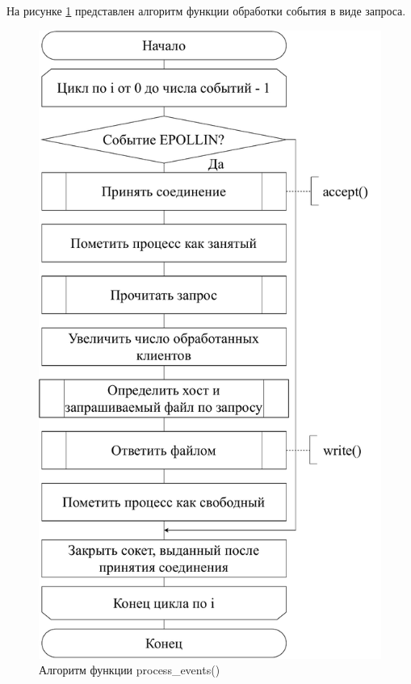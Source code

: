 На рисунке \ref{scheme-process-events} представлен алгоритм функции обработки события в виде запроса.

\begin{figure}[H]
	\centering
	\includegraphics[scale=0.6]{img/process_events.pdf}
	\caption{Алгоритм функции process\_events()}
	\label{scheme-process-events}
\end{figure}

\newpage

